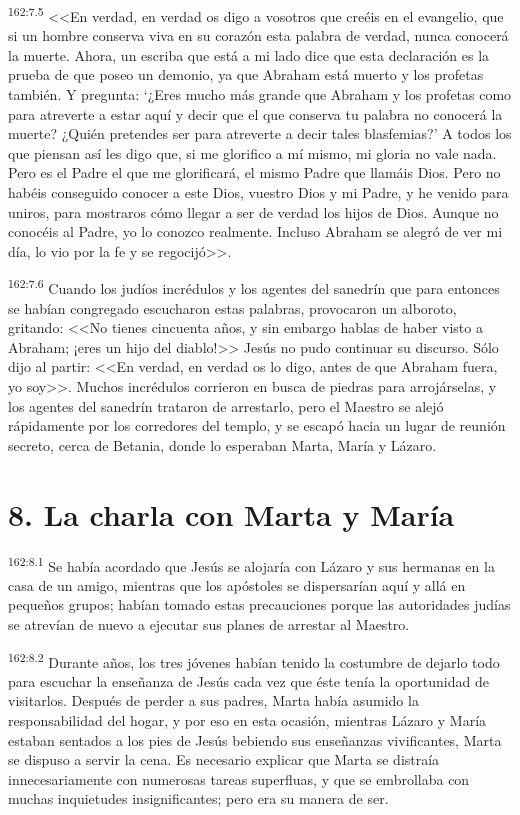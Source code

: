 \par 
\textsuperscript{162:7.5} <<En verdad, en verdad os digo a vosotros que creéis en el evangelio, que si un hombre conserva viva en su corazón esta palabra de verdad, nunca conocerá la muerte. Ahora, un escriba que está a mi lado dice que esta declaración es la prueba de que poseo un demonio, ya que Abraham está muerto y los profetas también. Y pregunta: `¿Eres mucho más grande que Abraham y los profetas como para atreverte a estar aquí y decir que el que conserva tu palabra no conocerá la muerte? ¿Quién pretendes ser para atreverte a decir tales blasfemias?' A todos los que piensan así les digo que, si me glorifico a mí mismo, mi gloria no vale nada. Pero es el Padre el que me glorificará, el mismo Padre que llamáis Dios. Pero no habéis conseguido conocer a este Dios, vuestro Dios y mi Padre, y he venido para uniros, para mostraros cómo llegar a ser de verdad los hijos de Dios. Aunque no conocéis al Padre, yo lo conozco realmente. Incluso Abraham se alegró de ver mi día, lo vio por la fe y se regocijó>>.

\par 
\textsuperscript{162:7.6} Cuando los judíos incrédulos y los agentes del sanedrín que para entonces se habían congregado escucharon estas palabras, provocaron un alboroto, gritando: <<No tienes cincuenta años, y sin embargo hablas de haber visto a Abraham; ¡eres un hijo del diablo!>> Jesús no pudo continuar su discurso. Sólo dijo al partir: <<En verdad, en verdad os lo digo, antes de que Abraham fuera, yo soy>>. Muchos incrédulos corrieron en busca de piedras para arrojárselas, y los agentes del sanedrín trataron de arrestarlo, pero el Maestro se alejó rápidamente por los corredores del templo, y se escapó hacia un lugar de reunión secreto, cerca de Betania, donde lo esperaban Marta, María y Lázaro.

\section*{8. La charla con Marta y María}
\par 
\textsuperscript{162:8.1} Se había acordado que Jesús se alojaría con Lázaro y sus hermanas en la casa de un amigo, mientras que los apóstoles se dispersarían aquí y allá en pequeños grupos; habían tomado estas precauciones porque las autoridades judías se atrevían de nuevo a ejecutar sus planes de arrestar al Maestro.

\par 
\textsuperscript{162:8.2} Durante años, los tres jóvenes habían tenido la costumbre de dejarlo todo para escuchar la enseñanza de Jesús cada vez que éste tenía la oportunidad de visitarlos. Después de perder a sus padres, Marta había asumido la responsabilidad del hogar, y por eso en esta ocasión, mientras Lázaro y María estaban sentados a los pies de Jesús bebiendo sus enseñanzas vivificantes, Marta se dispuso a servir la cena. Es necesario explicar que Marta se distraía innecesariamente con numerosas tareas superfluas, y que se embrollaba con muchas inquietudes insignificantes; pero era su manera de ser.

